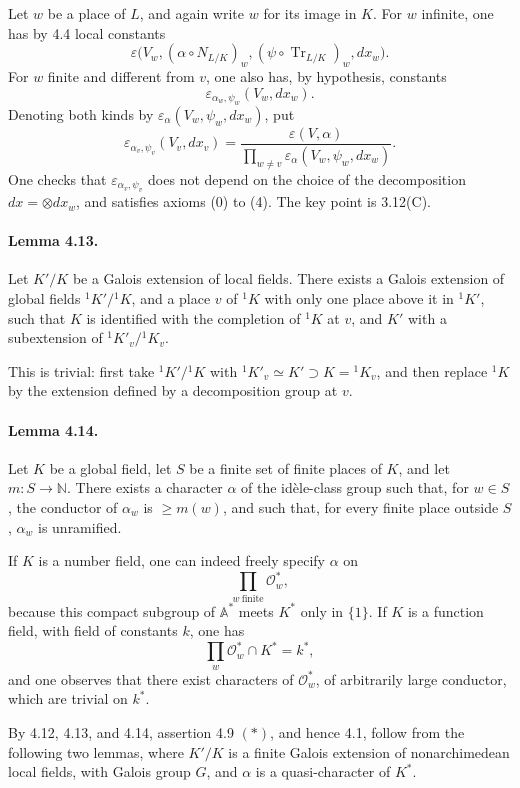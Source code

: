 \documentclass[10pt,letterpaper]{article}
\newcommand{\Tr}{\operatorname{Tr}}
\providecommand{\Tr}{\operatorname{Tr}}
\providecommand{\Tr}{\operatorname{Tr}}
\providecommand{\Tr}{\operatorname{Tr}}
\begin{document}
Let \(w\) be a place of \(L\), and again write \(w\) for its image in \(K\). For \(w\) infinite, one has by 4.4 local constants
\[
\varepsilon\bigl(V_w,(\alpha\circ N_{L/K})_w,
(\psi\circ\Tr_{L/K})_w,dx_w\bigr).
\]
For \(w\) finite and different from \(v\), one also has, by hypothesis, constants
\[
\varepsilon_{\alpha_w,\psi_w}(V_w,dx_w).
\]
Denoting both kinds by \(\varepsilon_\alpha(V_w,\psi_w,dx_w)\), put
\[
\varepsilon_{\alpha_v,\psi_v}(V_v,dx_v)
=
\frac{\varepsilon(V,\alpha)}
{\displaystyle\prod_{w\ne v}\varepsilon_\alpha(V_w,\psi_w,dx_w)}.
\]
One checks that \(\varepsilon_{\alpha_v,\psi_v}\) does not depend on the choice of the decomposition \(dx=\otimes dx_w\), and satisfies axioms (0) to (4). The key point is 3.12(C).

\paragraph{Lemma 4.13.} Let \(K'/K\) be a Galois extension of local fields. There exists a Galois extension of global fields \(^{1}K'/{}^{1}K\), and a place \(v\) of \(^{1}K\) with only one place above it in \(^{1}K'\), such that \(K\) is identified with the completion of \(^{1}K\) at \(v\), and \(K'\) with a subextension of \(^{1}K'_v/{}^{1}K_v\).

This is trivial: first take \(^{1}K'/{}^{1}K\) with \(^{1}K'_v\simeq K'\supset K={}^{1}K_v\), and then replace \(^{1}K\) by the extension defined by a decomposition group at \(v\).

\paragraph{Lemma 4.14.} Let \(K\) be a global field, let \(S\) be a finite set of finite places of \(K\), and let \(m:S\to\mathbb N\). There exists a character \(\alpha\) of the idèle-class group such that, for \(w\in S\), the conductor of \(\alpha_w\) is \(\ge m(w)\), and such that, for every finite place outside \(S\), \(\alpha_w\) is unramified.

If \(K\) is a number field, one can indeed freely specify \(\alpha\) on
\[
\prod_{w\ \mathrm{finite}}\mathcal O_w^*,
\]
because this compact subgroup of \(\mathbb A^*\) meets \(K^*\) only in \(\{1\}\). If \(K\) is a function field, with field of constants \(k\), one has
\[
\prod_w\mathcal O_w^*\cap K^*=k^*,
\]
and one observes that there exist characters of \(\mathcal O_w^*\), of arbitrarily large conductor, which are trivial on \(k^*\).

By 4.12, 4.13, and 4.14, assertion 4.9 \((*)\), and hence 4.1, follow from the following two lemmas, where \(K'/K\) is a finite Galois extension of nonarchimedean local fields, with Galois group \(G\), and \(\alpha\) is a quasi-character of \(K^*\).
\end{document}
